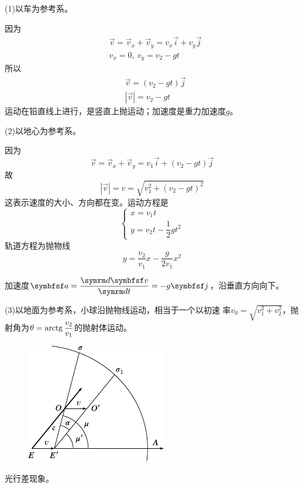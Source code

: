   \solution (1)以车为参考系。

  因为\vspace{-1em}
  \begin{align*}
     & \vec{v}=\vec{v}_x+\vec{v}_y=v_x\vec{i}+v_y\vec{j} \\
     & v_x=0,~ v_y=v_2-gt
  \end{align*}
  所以\vspace{-1em}
  \begin{align*}
     & \vec{v}=\left(v_2-gt\right)\vec{j} \\
     & |\vec{v}|=v_2-gt
  \end{align*}
  运动在铅直线上进行，是竖直上抛运动；加速度是重力加速度$g$。

  (2)以地心为参考系。

  因为\vspace{-1em}
  \begin{equation*}
    \vec{v}=\vec{v}_x+\vec{v}_y=v_1\vec{i}+\left(v_2-gt\right)\vec{j}
  \end{equation*}
  故\vspace{-1em}
  \begin{equation*}
    |\vec{v}|=v=\sqrt{v_1^2+\left(v_2-gt\right)^2}
  \end{equation*}
  这表示速度的大小、方向都在变。运动方程是
  \begin{equation*}
    \left\{\begin{array}{l}
      x=v_1t \\
      y=v_2t-\dfrac{1}{2}gt^2
    \end{array}\right.
  \end{equation*}
  轨道方程为抛物线
  \begin{equation*}
    y=\frac{v_2}{v_1}x-\frac{g}{2v_1}x^2
  \end{equation*}

  \noindent 加速度$\vec{a}=\dfrac{\dif \vec{v}}{\dif t}=-g\vec{j}$，沿垂直方向向下。

  (3)以地面为参考系，小球沿抛物线运动，相当于一个以初速
  率$\displaystyle v_0=\sqrt{v_1^2+v_2^2}$，抛射角为$\theta=\operatorname{arctg}\dfrac{v_2}{v_1}$的抛射体运动。

  \begin{figure}
    \vspace{1em}
    \centering
    \includegraphics{figure/fig02.09}
    \caption{}
    \label{fig:02.09}
  \end{figure}
  \example 光行差现象。

